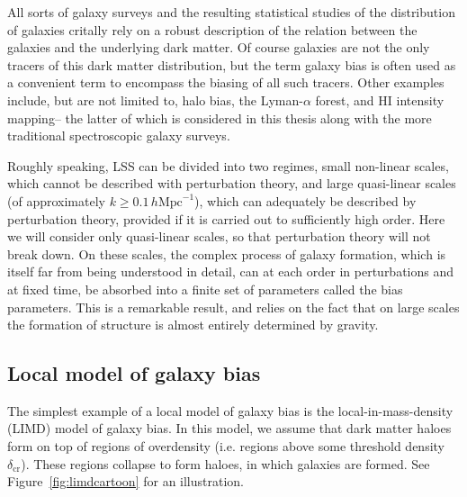 All sorts of galaxy surveys and the resulting statistical studies of the distribution of galaxies critally rely on a robust description of the relation between the galaxies and the underlying dark matter. Of course galaxies are not the only tracers of this dark matter distribution, but the term galaxy bias is often used as a convenient term to encompass the biasing of all such tracers. Other examples include, but are not limited to, halo bias, the Lyman-$\alpha$ forest, and HI intensity mapping-- the latter of which is considered in this thesis along with the more traditional spectroscopic galaxy surveys. 

Roughly speaking, LSS can be divided into two regimes, small non-linear scales, which cannot be described with perturbation theory, and large quasi-linear scales (of approximately $k \geq 0.1\,h\mathrm{Mpc}^{-1}$), which can adequately be described by perturbation theory, provided if it is carried out to sufficiently high order. Here we will consider only quasi-linear scales, so that perturbation theory will not break down. On these scales, the complex process of galaxy formation, which is itself far from being understood in detail, can at each order in perturbations and at fixed time, be absorbed into a finite set of parameters called the bias parameters. This is a remarkable result, and relies on the fact that on large scales the formation of structure is almost entirely determined by gravity. 

\subsection{Local model of galaxy bias}

The simplest example of a local model of galaxy bias is the local-in-mass-density (LIMD) model of galaxy bias. In this model, we assume that dark matter haloes form on top of regions of overdensity (i.e. regions above some threshold density $\delta_\mathrm{cr}$). These regions collapse to form haloes, in which galaxies are formed. See Figure~\ref{fig:limdcartoon} for an illustration. 

